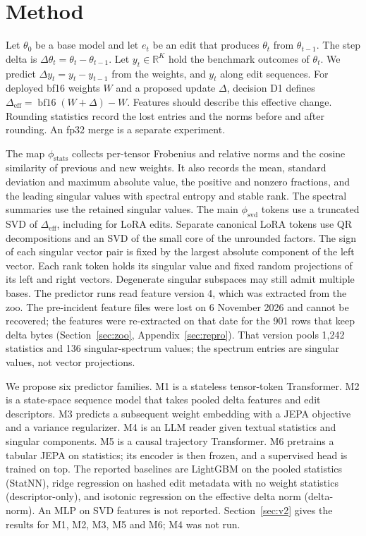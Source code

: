 \section{Method}
Let $\theta_0$ be a base model and let $e_t$ be an edit that produces $\theta_t$ from $\theta_{t-1}$. The step delta is $\Delta\theta_t=\theta_t-\theta_{t-1}$. Let $y_t\in\mathbb{R}^K$ hold the benchmark outcomes of $\theta_t$. We predict $\Delta y_t=y_t-y_{t-1}$ from the weights, and $y_t$ along edit sequences. For deployed bf16 weights $W$ and a proposed update $\Delta$, decision D1 defines $\Delta_{\mathrm{eff}}=\operatorname{bf16}(W+\Delta)-W$. Features should describe this effective change. Rounding statistics record the lost entries and the norms before and after rounding. An fp32 merge is a separate experiment.

The map $\phi_{\mathrm{stats}}$ collects per-tensor Frobenius and relative norms and the cosine similarity of previous and new weights. It also records the mean, standard deviation and maximum absolute value, the positive and nonzero fractions, and the leading singular values with spectral entropy and stable rank. The spectral summaries use the retained singular values. The main $\phi_{\mathrm{svd}}$ tokens use a truncated SVD of $\Delta_{\mathrm{eff}}$, including for LoRA edits. Separate canonical LoRA tokens use QR decompositions and an SVD of the small core of the unrounded factors. The sign of each singular vector pair is fixed by the largest absolute component of the left vector. Each rank token holds its singular value and fixed random projections of its left and right vectors. Degenerate singular subspaces may still admit multiple bases. The predictor runs read feature version 4, which was extracted from the zoo. The pre-incident feature files were lost on 6 November 2026 and cannot be recovered; the features were re-extracted on that date for the 901 rows that keep delta bytes (Section~\ref{sec:zoo}, Appendix~\ref{sec:repro}). That version pools 1,242 statistics and 136 singular-spectrum values; the spectrum entries are singular values, not vector projections.

We propose six predictor families. M1 is a stateless tensor-token Transformer. M2 is a state-space sequence model that takes pooled delta features and edit descriptors. M3 predicts a subsequent weight embedding with a JEPA objective and a variance regularizer. M4 is an LLM reader given textual statistics and singular components. M5 is a causal trajectory Transformer. M6 pretrains a tabular JEPA on statistics; its encoder is then frozen, and a supervised head is trained on top. The reported baselines are LightGBM on the pooled statistics (StatNN), ridge regression on hashed edit metadata with no weight statistics (descriptor-only), and isotonic regression on the effective delta norm (delta-norm). An MLP on SVD features is not reported. Section~\ref{sec:v2} gives the results for M1, M2, M3, M5 and M6; M4 was not run.

